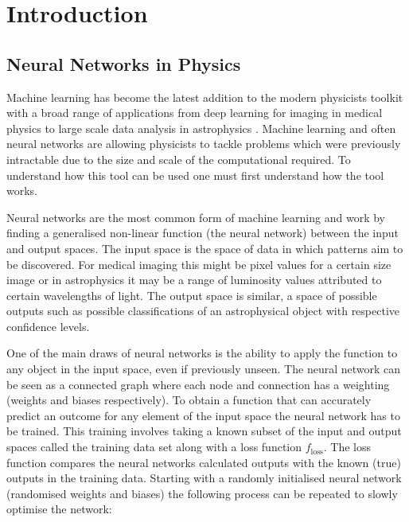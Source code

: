 \documentclass[10pt]{iopart}
\begin{document}
\section{Introduction}
\subsection{Neural Networks in Physics}
Machine learning has become the latest addition to the modern physicists toolkit with a broad range of applications from deep learning for imaging in medical physics \cite{MedPhysDL} to large scale data analysis in astrophysics \cite{astroML}. Machine learning and often neural networks are allowing physicists to tackle problems which were previously intractable due to the size and scale of the computational required. To understand how this tool can be used one must first understand how the tool works.

Neural networks are the most common form of machine learning and work by finding a generalised non-linear function (the neural network) between the input and output spaces. The input space is the space of data in which patterns aim to be discovered. For medical imaging this might be pixel values for a certain size image or in astrophysics it may be a range of luminosity values attributed to certain wavelengths of light. The output space is similar, a space of possible outputs such as possible classifications of an astrophysical object with respective confidence levels.

 One of the main draws of neural networks is the ability to apply the function to any object in the input space, even if previously unseen. The neural network can be seen as a connected graph where each node and connection has a weighting (weights and biases respectively). To obtain a function that can accurately predict an outcome for any element of the input space the neural network has to be trained. This training involves taking a known subset of the input and output spaces called the training data set along with a loss function $f_{\mathrm{loss}}$. The loss function compares the neural networks calculated outputs with the known (true) outputs in the training data. Starting with a randomly initialised neural network (randomised weights and biases) the following process can be repeated to slowly optimise the network:
 
\end{document}

